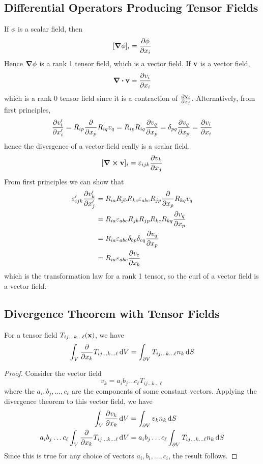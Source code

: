 \subsection{Differential Operators Producing Tensor Fields}
If \(\phi\) is a scalar field, then
\[
	[\grad\phi]_i = \pdv{\phi}{x_i}
\]
Hence \(\grad\phi\) is a rank 1 tensor field, which is a vector field.
If \(\vb v\) is a vector field,
\[
	\div \vb v = \pdv{v_i}{x_i}
\]
which is a rank 0 tensor field since it is a contraction of \(\pdv{\vb v_i}{x_j}\).
Alternatively, from first principles,
\[
	\pdv{v_i'}{x_i'} = R_{ip}\pdv{x_p}R_{iq}v_q = R_{ip}R_{iq}\pdv{v_q}{x_p} = \delta_{pq}\pdv{v_q}{x_p} = \pdv{v_i}{x_i}
\]
hence the divergence of a vector field really is a scalar field.
\[
	[\curl \vb v]_i = \varepsilon_{ijk} \pdv{v_k}{x_j}
\]
From first principles we can show that
\begin{align*}
	\varepsilon_{ijk}' \pdv{v_k'}{x_j'} & = R_{ia}R_{jb}R_{kc}\varepsilon_{abc} R_{jp}\pdv{x_p} R_{kq}v_q       \\
	                                    & = R_{ia} \varepsilon_{abc} R_{jb} R_{jp} R_{kc} R_{kq} \pdv{v_q}{x_p} \\
	                                    & = R_{ia} \varepsilon_{abc} \delta_{bp} \delta_{cq} \pdv{v_q}{x_p}     \\
	                                    & = R_{ia} \varepsilon_{abc} \pdv{v_c}{x_b}
\end{align*}
which is the transformation law for a rank 1 tensor, so the curl of a vector field is a vector field.

\subsection{Divergence Theorem with Tensor Fields}
\begin{proposition}
	For a tensor field \(T_{ij\dots k \dots \ell}(\vb x)\), we have
	\[
		\int_V \pdv{x_k} T_{ij\dots k \dots \ell} \dd{V} = \int_{\partial V} T_{ij\dots k \dots \ell} n_k \dd{S}
	\]
\end{proposition}
\begin{proof}
	Consider the vector field
	\[
		v_k = a_i b_j \dots c_\ell T_{ij\dots k \dots \ell}
	\]
	where the \(a_i, b_j, \dots, c_\ell\) are the components of some constant vectors.
	Applying the divergence theorem to this vector field, we have
	\begin{align*}
		\int_V \pdv{v_k}{x_k} \dd{V}                                         & = \int_{\partial V} v_k n_k \dd{S}                                          \\
		a_i b_j \dots c_\ell \int_V \pdv{x_k} T_{ij\dots k\dots \ell} \dd{V} & = a_i b_j \dots c_\ell \int_{\partial V} T_{ij\dots k\dots \ell} n_k \dd{S}
	\end{align*}
	Since this is true for any choice of vectors \(a_i, b_i, \dots, c_i\), the result follows.
\end{proof}

